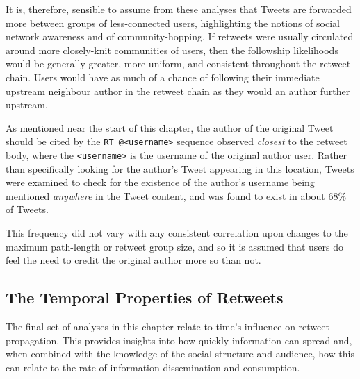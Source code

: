 It is, therefore, sensible to assume from these analyses that Tweets are forwarded more between groups of less-connected users, highlighting the notions of social network awareness and of community-hopping. If retweets were usually circulated around more closely-knit communities of users, then the followship likelihoods would be generally greater, more uniform, and consistent throughout the retweet chain. Users would have as much of a chance of following their immediate upstream neighbour author in the retweet chain as they would an author further upstream.

As mentioned near the start of this chapter, the author of the original Tweet should be cited by the \texttt{RT @<username>} sequence observed \textit{closest} to the retweet body, where the \texttt{<username>} is the username of the original author user. Rather than specifically looking for the author's Tweet appearing in this location, Tweets were examined to check for the existence of the author's username being mentioned \textit{anywhere} in the Tweet content, and was found to exist in about 68\% of Tweets.

This frequency did not vary with any consistent correlation upon changes to the maximum path-length or retweet group size, and so it is assumed that users do feel the need to credit the original author more so than not. 

 
\subsection{The Temporal Properties of Retweets}
The final set of analyses in this chapter relate to time's influence on retweet propagation. This provides insights into how quickly information can spread and, when combined with the knowledge of the social structure and audience, how this can relate to the rate of information dissemination and consumption.


